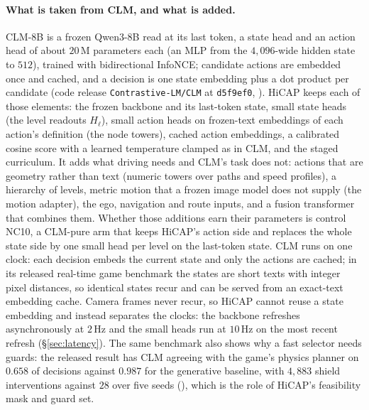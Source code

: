 \paragraph{What is taken from CLM, and what is added.}
CLM-8B is a frozen Qwen3-8B read at its last token, a state head and an action head of about $20$\,M parameters each (an MLP from the $4{,}096$-wide hidden state to $512$), trained with bidirectional InfoNCE; candidate actions are embedded once and cached, and a decision is one state embedding plus a dot product per candidate (code release \texttt{Contrastive-LM/CLM} at \texttt{d5f9ef0}, \evP). HiCAP keeps each of those elements: the frozen backbone and its last-token state, small state heads (the level readouts $H_\ell$), small action heads on frozen-text embeddings of each action's definition (the node towers), cached action embeddings, a calibrated cosine score with a learned temperature clamped as in CLM, and the staged curriculum. It adds what driving needs and CLM's task does not: actions that are geometry rather than text (numeric towers over paths and speed profiles), a hierarchy of levels, metric motion that a frozen image model does not supply (the motion adapter), the ego, navigation and route inputs, and a fusion transformer that combines them. Whether those additions earn their parameters is control NC10, a CLM-pure arm that keeps HiCAP's action side and replaces the whole state side by one small head per level on the last-token state. CLM runs on one clock: each decision embeds the current state and only the actions are cached; in its released real-time game benchmark the states are short texts with integer pixel distances, so identical states recur and can be served from an exact-text embedding cache. Camera frames never recur, so HiCAP cannot reuse a state embedding and instead separates the clocks: the backbone refreshes asynchronously at $2$\,Hz and the small heads run at $10$\,Hz on the most recent refresh (\S\ref{sec:latency}). The same benchmark also shows why a fast selector needs guards: the released result has CLM agreeing with the game's physics planner on $0.658$ of decisions against $0.987$ for the generative baseline, with $4{,}883$ shield interventions against $28$ over five seeds (\evP), which is the role of HiCAP's feasibility mask and guard set.

